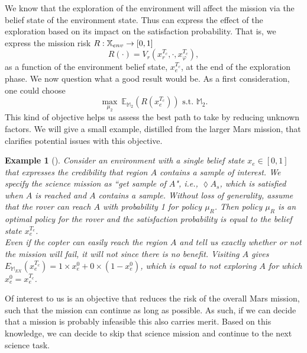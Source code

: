 \documentclass[conference]{IEEEtran}
\newtheorem{example}{Example}
\begin{document}
We know that the exploration of the environment will affect the mission via the  belief state of the environment state.
Thus can express the effect of the exploration based on its impact on the satisfaction probability. That is, we express the mission risk $R:\mathbb{X}_{env}\rightarrow [0,1]$ 
\begin{equation}
	R(\cdot) = V_r(x^{T_c}_r, \cdot, x^{T_c}_\varphi),
\end{equation}
as a function of the environment belief state,  $x_e^{T_c}$,  at the end of the exploration phase.
We now question what a good result would be. 
As a first consideration, one could choose
\begin{equation}
	\max_{\mu_{2}}\  \mathbb E_{\mathbb M_{2}} (R(x^{T_c}_e)  ) \mbox{ s.t.  }\mathbb M_{2}.
\end{equation}
 This kind of objective helps us assess the best path to take by reducing unknown factors.  We will give a small example, distilled from the larger Mars mission, that clarifies potential issues with this objective.
\begin{example}[]
	Consider an environment with a single belief state $x_e\in[0,1]$ that expresses the credibility that region $A$ contains a sample of interest.
	We specify the science mission as  ``\emph{get  sample of $A$}", i.e.,  $\lozenge A_s$, which is satisfied when $A$ is reached and $A$ contains a sample.
	Without loss of generality, assume that the rover can reach $A$ with probability 1 for policy $\mu_R$. Then policy $\mu_R$ is an optimal policy for the rover and the satisfaction probability is equal to the belief state $x_e^{T_e}$.
	\\
Even if the copter can easily reach the region $A$ and tell us exactly whether or not the mission will fail, it will not since there is no benefit. 
Visiting $A$ gives $E_{\mathbb M_{EX}} (x^{T_c}_e ) = 1\times x_e^{0} +  0\times (1- x_e^{0})$, which is equal to not exploring $A$ for which $ x_e^{0}= x_e^{T_c}$.

\end{example} 
 
 Of interest to us is an objective that reduces the risk of the overall Mars mission, such that the mission can continue as long as possible. 
 As such, if we can decide that a mission is probably infeasible this also carries merit. Based on this knowledge, we can decide to skip that science mission and continue to the next science task. 
\end{document}
